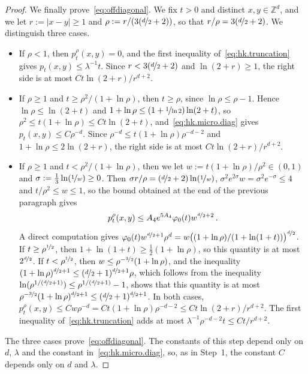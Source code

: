 \documentclass[11pt]{amsart}
\numberwithin{equation}{section}
\newcommand{\Z}{\mathbb{Z}}
\newcommand{\nf}{\nicefrac}
\begin{document}
\begin{proof}
We finally prove~\eqref{eq:offdiagonal}.
We fix $t > 0$ and distinct $x, y \in \Z^d$, and we let $r := |x - y| \geq 1$ and $\rho := r / (3 (\nf{d}{2} + 2))$, so that $r / \rho = 3 (\nf{d}{2} + 2)$.
We distinguish three cases.
\begin{itemize}
    \item If $\rho < 1$, then $p^\rho_t(x,y) = 0$, and the first inequality of~\eqref{eq:hk.truncation} gives $p_t(x,y) \leq \lambda^{-1} t$.
    Since $r < 3 (\nf{d}{2} + 2)$ and $\ln(2 + r) \geq 1$, the right side is at most $C t \ln(2 + r) / r^{d+2}$.
    \item If $\rho \geq 1$ and $t \geq \rho^2 / (1 + \ln \rho)$, then $t \geq \rho$, since $\ln \rho \leq \rho - 1$.
    Hence $\ln \rho \leq \ln(2 + t)$ and $1 + \ln \rho \leq (1 + \nf{1}{\ln 2}) \ln(2 + t)$, so $\rho^2 \leq t (1 + \ln \rho) \leq C t \ln(2 + t)$, and~\eqref{eq:hk.micro.diag} gives $p_t(x,y) \leq C \rho^{-d}$.
    Since $\rho^{-d} \leq t (1 + \ln \rho) \rho^{-d-2}$ and $1 + \ln \rho \leq 2 \ln(2 + r)$, the right side is at most $C t \ln(2 + r) / r^{d+2}$.
    \item If $\rho \geq 1$ and $t < \rho^2 / (1 + \ln \rho)$, then we let $w := t (1 + \ln \rho) / \rho^2 \in (0, 1)$ and $\sigma := \frac13 \ln(\nf{1}{w}) \geq 0$.
    Then $\sigma r / \rho = (\nf{d}{2} + 2) \ln(\nf{1}{w})$, $\sigma^2 e^{2 \sigma} w = \sigma^2 e^{-\sigma} \leq 4$ and $t / \rho^2 \leq w \leq 1$, so the bound obtained at the end of the previous paragraph gives
    \begin{equation*}
        p^\rho_t(x,y) \leq A_4 e^{5 A_4} \varphi_0(t) w^{\nf{d}{2} + 2}\,.
    \end{equation*}
    A direct computation gives $\varphi_0(t) w^{\nf{d}{2} + 1} \rho^d = w \bigl( (1 + \ln \rho)/(1 + \ln(1 + t)) \bigr)^{\nf{d}{2}}$.
    If $t \geq \rho^{\nf12}$, then $1 + \ln(1 + t) \geq \frac12 (1 + \ln \rho)$, so this quantity is at most $2^{\nf{d}{2}}$.
    If $t < \rho^{\nf12}$, then $w \leq \rho^{-\nf32} (1 + \ln \rho)$, and the inequality $(1 + \ln \rho)^{\nf{d}{2} + 1} \leq (\nf{d}{2} + 1)^{\nf{d}{2} + 1} \rho$, which follows from the inequality $\ln(\rho^{1/(\nf{d}{2} + 1)}) \leq \rho^{1/(\nf{d}{2} + 1)} - 1$, shows that this quantity is at most $\rho^{-\nf32} (1 + \ln \rho)^{\nf{d}{2} + 1} \leq (\nf{d}{2} + 1)^{\nf{d}{2} + 1}$.
    In both cases, $p^\rho_t(x,y) \leq C w \rho^{-d} = C t (1 + \ln \rho) \rho^{-d-2} \leq C t \ln(2 + r) / r^{d+2}$.
    The first inequality of~\eqref{eq:hk.truncation} adds at most $\lambda^{-1} \rho^{-d-2} t \leq C t / r^{d+2}$.
\end{itemize}
The three cases prove~\eqref{eq:offdiagonal}.
The constants of this step depend only on $d$, $\lambda$ and the constant in~\eqref{eq:hk.micro.diag}, so, as in Step~1, the constant $C$ depends only on $d$ and $\lambda$.


\end{proof}
\end{document}
